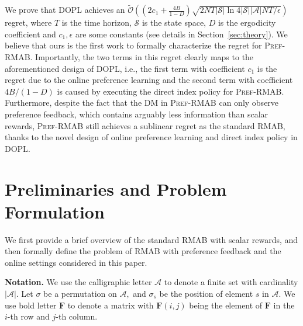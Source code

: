 \documentclass{article} %
\newcommand{\RMABPF}{\textsc{Pref-RMAB}\xspace}
\newcommand{\DOPL}{\textsc{DOPL}\xspace}
\newcommand{\bF}{\mathbf{F}}
\newcommand{\cA}{\mathcal{A}}
\newcommand{\cS}{\mathcal{S}}
\begin{document}
We prove that \DOPL achieves an $\tilde{\mathcal{O}}((2c_1+\frac{4B}{1-D})\sqrt{2NT|\cS|\ln{4|\cS||\cA|NT}/{\epsilon}})$ regret, where $T$ is the time horizon, $\cS$ is the state space, $D$ is the ergodicity coefficient and $c_1,\epsilon$ are some constants (see details in Section~\ref{sec:theory}). We believe that ours is the first work to formally characterize the regret for \RMABPF. Importantly, the two terms in this regret clearly maps to the aforementioned design of \DOPL, i.e., the first term with coefficient $c_1$ is the regret due to the online preference learning and the second term with coefficient $4B/(1-D)$ is caused by executing the direct index policy for \RMABPF. Furthermore,  despite the fact that the DM in \RMABPF can only observe preference feedback, which contains arguably less information than scalar rewards, \RMABPF still achieves a sublinear regret as the standard RMAB, thanks to the novel design of online preference learning and direct index policy in \DOPL. 


\section{Preliminaries and Problem Formulation}\label{sec:formulation}
We first provide a brief overview of the standard RMAB with scalar rewards, and then formally define the problem of RMAB with preference feedback and the online settings considered in this paper. 
 
\textbf{Notation.} We use the calligraphic letter $\cA$ to denote a finite set with cardinality $|\cA|$.  
Let $\sigma$ be a permutation on $\cA,$ and $\sigma_s$ be the position of element $s$ in $\cA.$
We use bold letter $\bF$ to denote a matrix with $\bF(i,j)$ being the element of $\bF$ in the $i$-th row and $j$-th column.
\end{document}
